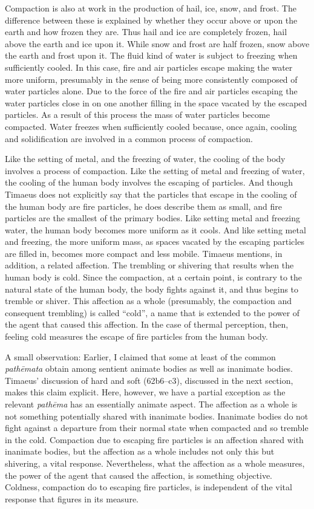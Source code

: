 Compaction is also at work in the production of hail, ice, snow, and frost. The difference between these is explained by whether they occur above or upon the earth and how frozen they are. Thus hail and ice are completely frozen, hail above the earth and ice upon it. While snow and frost are half frozen, snow above the earth and frost upon it. The fluid kind of water is subject to freezing when sufficiently cooled. In this case, fire and air particles escape making the water more uniform, presumably in the sense of being more consistently composed of water particles alone. Due to the force of the fire and air particles escaping the water particles close in on one another filling in the space vacated by the escaped particles. As a result of this process the mass of water particles become compacted. Water freezes when sufficiently cooled because, once again, cooling and solidification are involved in a common process of compaction.


Like the setting of metal, and the freezing of water, the cooling of the body involves a process of compaction. Like the setting of metal and freezing of water, the cooling of the human body involves the escaping of particles. And though Timaeus does not explicitly say that the particles that escape in the cooling of the human body are fire particles, he does describe them as small, and fire particles are the smallest of the primary bodies. Like setting metal and freezing water, the human body becomes more uniform as it cools. And like setting metal and freezing, the more uniform mass, as spaces vacated by the escaping particles are filled in, becomes more compact and less mobile. Timaeus mentions, in addition, a related affection. The trembling or shivering that results when the human body is cold. Since the compaction, at a certain point, is contrary to the natural state of the human body, the body fights against it, and thus begins to tremble or shiver. This affection as a whole (presumably, the compaction and consequent trembling) is called ``cold'', a name that is extended to the power of the agent that caused this affection. In the case of thermal perception, then, feeling cold measures the escape of fire particles from the human body.

A small observation: Earlier, I claimed that some at least of the common \emph{pathēmata} obtain among sentient animate bodies as well as inanimate bodies. Timaeus' discussion of hard and soft (62b6–c3), discussed in the next section, makes this claim explicit. Here, however, we have a partial exception as the relevant \emph{pathēma} has an essentially animate aspect. The affection as a whole is not something potentially shared with inanimate bodies. Inanimate bodies do not fight against a departure from their normal state when compacted and so tremble in the cold. Compaction due to escaping fire particles is an affection shared with inanimate bodies, but the affection as a whole includes not only this but shivering, a vital response. Nevertheless, what the affection as a whole measures, the power of the agent that caused the affection, is something objective. Coldness, compaction do to escaping fire particles, is independent of the vital response that figures in its measure.

